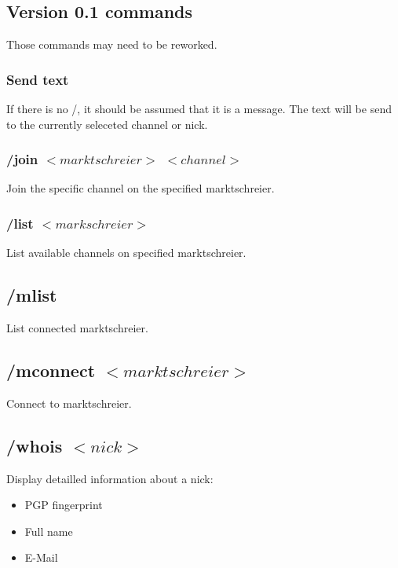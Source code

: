 \documentclass[12pt,a4paper]{book}
\begin{document}
\subsection{Version 0.1 commands}
Those commands may need to be reworked.
\subsubsection{Send text}
If there is no /, it should be assumed that it is a message.
The text will be send to the currently seleceted channel or nick.

\subsubsection{/join $<marktschreier>$ $<channel>$}
Join the specific channel on the specified marktschreier.

\subsubsection{/list $<markschreier>$}
List available channels on specified marktschreier.

\subsection{/mlist}
List connected marktschreier.

\subsection{/mconnect $<marktschreier>$}
Connect to marktschreier.

\subsection{/whois $<nick>$}
Display detailled information about a nick:
\begin{itemize}
\item PGP fingerprint
\item Full name
\item E-Mail
\end{itemize}
\end{document}
